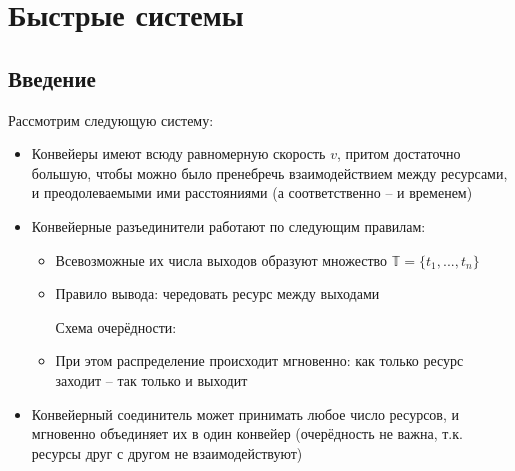 \chapter{Быстрые системы}

\section{Введение}

\noindent Рассмотрим следующую систему:

\begin{itemize}
	\item Конвейеры имеют всюду равномерную скорость $v$, притом достаточно большую, чтобы можно было пренебречь взаимодействием между ресурсами, и преодолеваемыми ими расстояниями (а соответственно -- и временем)
	
	\item Конвейерные разъединители работают по следующим правилам:
		\begin{itemize}
			\item Всевозможные их числа выходов образуют множество $\mathbb{T} = \{ t_1, ..., t_n \}$
			\item Правило вывода: чередовать ресурс между выходами 
				
				Схема очерёдности:
				
				\vspace{0.25in}
				
				
			\item При этом распределение происходит мгновенно: как только ресурс заходит -- так только и выходит
				
		\end{itemize}
		
	\item Конвейерный соединитель может принимать любое число ресурсов, и мгновенно объединяет их в один конвейер (очерёдность не важна, т.к. ресурсы друг с другом не взаимодействуют)
	
\end{itemize}






